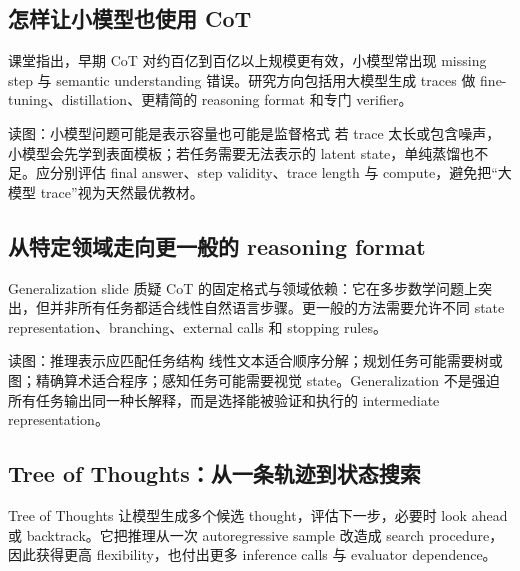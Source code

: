 \subsection{怎样让小模型也使用 CoT}

课堂指出，早期 CoT 对约百亿到百亿以上规模更有效，小模型常出现 missing step 与 semantic understanding 错误。研究方向包括用大模型生成 traces 做 fine-tuning、distillation、更精简的 reasoning format 和专门 verifier。


\begin{knowledgebox}{读图：小模型问题可能是表示容量也可能是监督格式}
若 trace 太长或包含噪声，小模型会先学到表面模板；若任务需要无法表示的 latent state，单纯蒸馏也不足。应分别评估 final answer、step validity、trace length 与 compute，避免把“大模型 trace”视为天然最优教材。
\end{knowledgebox}

\subsection{从特定领域走向更一般的 reasoning format}

Generalization slide 质疑 CoT 的固定格式与领域依赖：它在多步数学问题上突出，但并非所有任务都适合线性自然语言步骤。更一般的方法需要允许不同 state representation、branching、external calls 和 stopping rules。


\begin{knowledgebox}{读图：推理表示应匹配任务结构}
线性文本适合顺序分解；规划任务可能需要树或图；精确算术适合程序；感知任务可能需要视觉 state。Generalization 不是强迫所有任务输出同一种长解释，而是选择能被验证和执行的 intermediate representation。
\end{knowledgebox}

\subsection{Tree of Thoughts：从一条轨迹到状态搜索}

Tree of Thoughts 让模型生成多个候选 thought，评估下一步，必要时 look ahead 或 backtrack。它把推理从一次 autoregressive sample 改造成 search procedure，因此获得更高 flexibility，也付出更多 inference calls 与 evaluator dependence。

